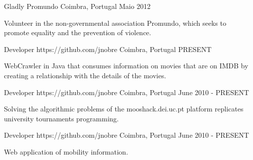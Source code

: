 


\begin{cventries}


\cventry
{Gladly} %
{Promundo} %
{Coimbra, Portugal} %
{Maio 2012} %
{ %
\begin{cvitems}
\item {Volunteer in the non-governmental association Promundo, which seeks to promote equality and the prevention of violence.}
\end{cvitems}
}


\cventry
{Developer} %
{https://github.com/jnobre} %
{Coimbra, Portugal} %
{PRESENT} %
{ %
\begin{cvitems}
\item {WebCrawler in Java that consumes information on movies that are on IMDB by creating a relationship with the details of the movies.}
\end{cvitems}
}


\cventry
{Developer} %
{https://github.com/jnobre} %
{Coimbra, Portugal} %
{June 2010 - PRESENT} %
{ %
\begin{cvitems}
\item {Solving the algorithmic problems of the mooshack.dei.uc.pt platform replicates university tournaments programming.}
\end{cvitems}
}


\cventry
{Developer} %
{https://github.com/jnobre} %
{Coimbra, Portugal} %
{June 2010 - PRESENT} %
{ %
\begin{cvitems}
\item {Web application of mobility information.}
\end{cvitems}
}


\end{cventries}